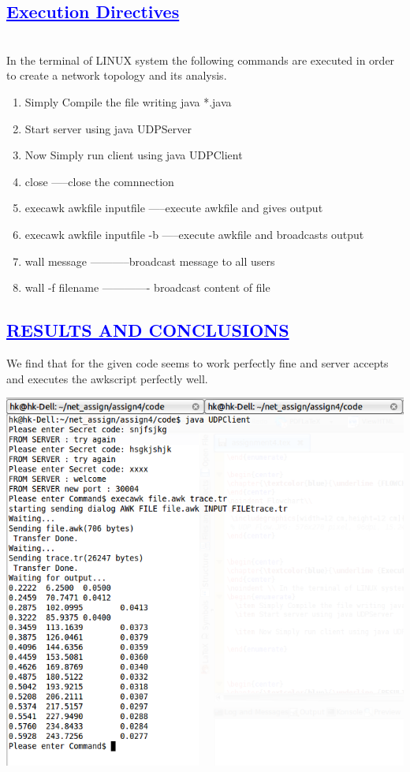 \documentclass[a4paper,12pt]{report}
\begin{document}
\begin{center}
\chapter{\textcolor{blue}{\underline {Execution Directives}}}
\end{center}
\noindent \\ In the terminal of LINUX system the following commands are executed in order to create a network topology and its analysis.\\
\begin{enumerate}
  \item Simply Compile the file writing java *.java
  \item Start server using java UDPServer
  
  \item Now Simply run client using java UDPClient
\item close -----close the comnnection
\item execawk awkfile inputfile -----execute awkfile and gives output
\item execawk awkfile inputfile -b -----execute awkfile and broadcasts output
\item wall message -----------broadcast message to all users
\item wall -f filename ------------- broadcast content of file
\end{enumerate}



\begin{center}
\chapter{\textcolor{blue}{\underline {RESULTS AND CONCLUSIONS}}}\end{center}
\noindent We find that for the given code seems to work perfectly fine and server accepts and executes the awkscript perfectly well.
\begin{center}
 \includegraphics[width=12 cm,height=12 cm]{./Screenshot.png}
\end{center}
\end{document}
